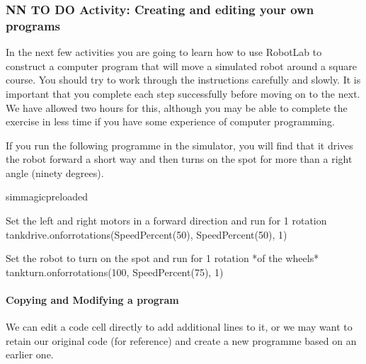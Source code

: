\documentclass[letterpaper,10pt,english]{sphinxmanual}
\begin{document}
\subsubsection{NN TO DO Activity: Creating and editing your own programs}
\label{\detokenize{content/01_Robot_Lab/Section_00_01:NN-TO-DO-Activity:-Creating-and-editing-your-own-programs}}
In the next few activities you are going to learn how to use RobotLab to construct a computer program that will move a simulated robot around a square course. You should try to work through the instructions carefully and slowly. It is important that you complete each step successfully before moving on to the next. We have allowed two hours for this, although you may be able to complete the exercise in less time if you have some experience of computer programming.

If you run the following programme in the simulator, you will find that it drives the robot forward a short way and then turns on the spot for more than a right angle (ninety degrees).


{
\begin{sphinxVerbatim}[commandchars=\\\{\}]
\llap{\color{nbsphinxin}[ ]:\,\hspace{\fboxrule}\hspace{\fboxsep}}\PYGZpc{}\PYGZpc{}sim\PYGZus{}magic\PYGZus{}preloaded

\PYGZsh{} Set the left and right motors in a forward direction
\PYGZsh{} and run for 1 rotation
tank\PYGZus{}drive.on\PYGZus{}for\PYGZus{}rotations(SpeedPercent(50), SpeedPercent(50), 1)


\PYGZsh{} Set the robot to turn on the spot
\PYGZsh{} and run for 1 rotation *of the wheels*
tank\PYGZus{}turn.on\PYGZus{}for\PYGZus{}rotations(\PYGZhy{}100, SpeedPercent(75), 1)
\end{sphinxVerbatim}
}


\paragraph{Copying and Modifying a program}
\label{\detokenize{content/01_Robot_Lab/Section_00_01:Copying-and-Modifying-a-program}}
We can edit a code cell directly to add additional lines to it, or we may want to retain our original code (for reference) and create a new programme based on an earlier one.
\end{document}
